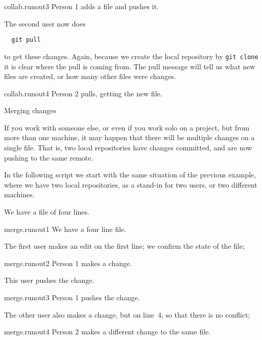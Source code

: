 \begin{gitstep}{collab.runout3}
  Person 1 adds a file and pushes it.
\end{gitstep}

The second user now does
\begin{lstlisting}
  git pull
\end{lstlisting}
to get these changes.
Again, because we create the local repository by \lstinline{git clone}
it is clear where the pull is coming from.
The pull message will tell us what new files are created,
or how many other files were changes.

\begin{gitstep}{collab.runout4}
  Person 2 pulls, getting the new file.
\end{gitstep}

\newpage
{} {Merging changes}

If you work with someone else, or even if you work solo on a project,
but from more than one machine, it may happen that there will be multiple
changes on a single file. That is, two local repositories have changes committed,
and are now pushing to the same remote.

In the following script we start with the same situation of the previous example,
where we have two local repositories, as a stand-in for two users,
or two different machines.

We have a file of four lines.

\begin{gitstep}{merge.runout1}
  We have a four line file.
\end{gitstep}

The first user makes an edit on the first line; we confirm the state of the file;

\begin{gitstep}{merge.runout2}
  Person 1 makes a change.
\end{gitstep}

This user pushes the change.

\begin{gitstep}{merge.runout3}
  Person 1 pushes the change.
\end{gitstep}

The other user also makes a change, but on line~4, so that there is no conflict;

\begin{gitstep}{merge.runout4}
  Person 2 makes a different change to the same file.
\end{gitstep}

